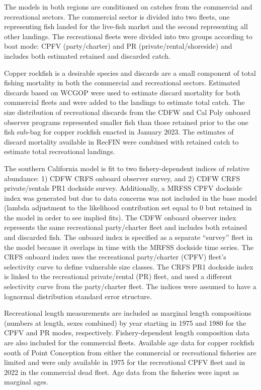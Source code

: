 \documentclass[11pt,
  english,
  letterpaper,
]{article}
\begin{document}
The models in both regions are conditioned on catches from the commercial and recreational sectors. The commercial sector is divided into two fleets, one representing fish landed for the live-fish market and the second representing all other landings. The recreational fleets were divided into two groups according to boat mode: CPFV (party/charter) and PR (private/rental/shoreside) and includes both estimated retained and discarded catch.

Copper rockfish is a desirable species and discards are a small component of total fishing mortality in both the commercial and recreational sectors. Estimated discards based on WCGOP were used to estimate discard mortality for both commercial fleets and were added to the landings to estimate total catch. The size distribution of recreational discards from the CDFW and Cal Poly onboard observer programs represented smaller fish than those retained prior to the one fish sub-bag for copper rockfish enacted in January 2023. The estimates of discard mortality available in RecFIN were combined with retained catch to estimate total recreational landings.

The southern California model is fit to two fishery-dependent indices of relative abundance: 1) CDFW CRFS onboard observer survey, and 2) CDFW CRFS private/rentals PR1 dockside survey. Additionally, a MRFSS CPFV dockside index was generated but due to data concerns was not included in the base model (lambda adjustment to the likelihood contribution set equal to 0 but retained in the model in order to see implied fits). The CDFW onboard observer index represents the same recreational party/charter fleet and includes both retained and discarded fish. The onboard index is specified as a separate ``survey'' fleet in the model because it overlaps in time with the MRFSS dockside time series. The CRFS onboard index uses the recreational party/charter (CPFV) fleet's selectivity curve to define vulnerable size classes. The CRFS PR1 dockside index is linked to the recreational private/rental (PR) fleet, and used a different selectivity curve from the party/charter fleet. The indices were assumed to have a lognormal distribution standard error structure.

Recreational length measurements are included as marginal length compositions (numbers at length, sexes combined) by year starting in 1975 and 1980 for the CPFV and PR modes, respectively. Fishery-dependent length composition data are also included for the commercial fleets. Available age data for copper rockfish south of Point Conception from either the commercial or recreational fisheries are limited and were only available in 1975 for the recreational CPFV fleet and in 2022 in the commercial dead fleet. Age data from the fisheries were input as marginal ages.
\end{document}

